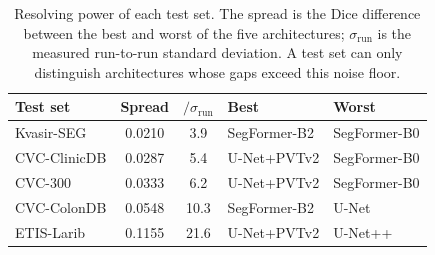 \begin{table}[t]
\centering
\footnotesize
\caption{Resolving power of each test set. The spread is the Dice difference between the best and worst of the five architectures; $\sigma_{\mathrm{run}}$ is the measured run-to-run standard deviation. A test set can only distinguish architectures whose gaps exceed this noise floor.}
\label{tab:resolving}
\begin{tabular}{lccll}
\toprule
Test set & Spread & $/\sigma_{\mathrm{run}}$ & Best & Worst \\
\midrule
Kvasir-SEG & 0.0210 & 3.9 & SegFormer-B2 & SegFormer-B0 \\
CVC-ClinicDB & 0.0287 & 5.4 & U-Net+PVTv2 & SegFormer-B0 \\
CVC-300 & 0.0333 & 6.2 & U-Net+PVTv2 & SegFormer-B0 \\
CVC-ColonDB & 0.0548 & 10.3 & SegFormer-B2 & U-Net \\
ETIS-Larib & 0.1155 & 21.6 & U-Net+PVTv2 & U-Net++ \\
\bottomrule
\end{tabular}
\end{table}
